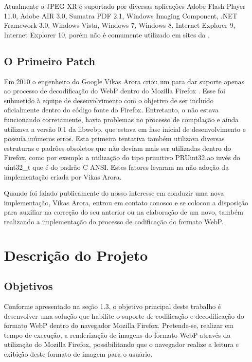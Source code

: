 \documentclass[espaco=simples,appendix=Name]{abnt}
\begin{document}
Atualmente o JPEG XR é suportado por diversas aplicações Adobe Flash Player 11.0, Adobe AIR 3.0, Sumatra PDF 2.1, Windows Imaging Component, .NET Framework 3.0, Windows Vista, Windows 7, Windows 8, Internet Explorer 9, Internet Explorer 10, porém não é comumente utilizado em sites da .\cite{HDPhoto}

\section{O Primeiro Patch}

Em 2010 o engenheiro do Google Vikas Arora criou um  para dar suporte apenas ao processo de decodificação do WebP dentro do Mozilla Firefox \cite{FirefoxBug}. Esse  foi submetido à equipe de desenvolvimento com o objetivo de ser incluído oficialmente dentro do código fonte do Firefox. Entretanto, o  não estava funcionando corretamente, havia problemas no processo de compilação e ainda utilizava a versão 0.1 da libwebp, que estava em fase inicial de desenvolvimento e possuía inúmeros erros. Esta primeira tentativa também utilizava diversas estruturas e padrões obsoletos que não deviam mais ser utilizadas dentro do Firefox, como por exemplo a utilização do tipo primitivo PRUint32 ao invés do uint32\_t que é do padrão C ANSI. Estes fatores levaram na não adoção da implementação criada por Vikas Arora.

Quando foi falado publicamente do nosso interesse em conduzir uma nova implementação, Vikas Arora, entrou em contato conosco e se colocou a disposição para auxiliar na correção do seu  anterior ou na elaboração de um novo, também realizando a implementação do processo de codificação do formato WebP.

\chapter{Descrição do Projeto}

\section{Objetivos}

Conforme apresentado na seção 1.3, o objetivo principal deste trabalho é desenvolver uma solução que habilite o suporte de codificação e decodificação do formato WebP dentro do navegador Mozilla Firefox.
Pretende-se, realizar em tempo de execução, a renderização de imagens do formato WebP através da utilização do Mozilla Firefox, possibilitando que o navegador realize a leitura e exibição deste formato de imagem para o usuário. 
\end{document}
